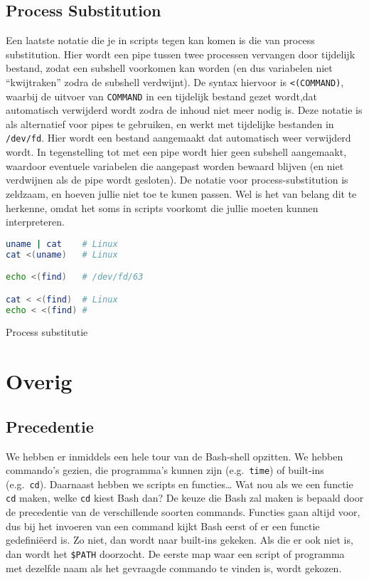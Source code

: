 \subsection{Process Substitution}\label{process-substitution}

Een laatste notatie die je in scripts tegen kan komen is die van process substitution. Hier wordt een pipe tussen twee processen vervangen door tijdelijk bestand, zodat een subshell voorkomen kan worden (en dus variabelen niet ``kwijtraken'' zodra de subshell verdwijnt). De syntax hiervoor is \texttt{\textless{}(COMMAND)}, waarbij de uitvoer van \texttt{COMMAND} in een tijdelijk bestand gezet wordt,dat automatisch verwijderd wordt zodra de inhoud niet meer nodig is. Deze notatie is als alternatief voor pipes te gebruiken, en werkt met tijdelijke bestanden in \texttt{/dev/fd}. Hier wordt een bestand aangemaakt dat automatisch weer verwijderd wordt. In tegenstelling tot met een pipe wordt hier geen subshell aangemaakt, waardoor eventuele variabelen die aangepast worden bewaard blijven (en niet verdwijnen als de pipe wordt gesloten). De notatie voor process-substitution is zeldzaam, en hoeven jullie niet toe te kunen passen. Wel is het van belang dit te herkenne, omdat het soms in scripts voorkomt die jullie moeten kunnen interpreteren.

\begin{listing}
\begin{lstlisting}[language=Bash]
uname | cat    # Linux
cat <(uname)   # Linux

echo <(find)   # /dev/fd/63

cat < <(find)  # Linux
echo < <(find) # 
\end{lstlisting}
\caption{Process substitutie}
\end{listing}

\section{Overig}\label{troubleshooting}

\subsection{Precedentie}\label{precedentie}

We hebben er inmiddels een hele tour van de Bash-shell opzitten. We hebben commando's gezien, die programma's kunnen zijn (e.g.~\texttt{time}) of built-ins (e.g.~\texttt{cd}). Daarnaast hebben we scripts en functies\ldots{} Wat nou als we een functie \texttt{cd} maken, welke \texttt{cd} kiest Bash dan? De keuze die Bash zal maken is bepaald door de precedentie van de verschillende soorten commands. Functies gaan altijd voor, dus bij het invoeren van een command kijkt Bash eerst of er een functie gedefiniëerd is. Zo niet, dan wordt naar built-ins gekeken. Als die er ook niet is, dan wordt het \texttt{\$PATH} doorzocht. De eerste map waar een script of programma met dezelfde naam als het gevraagde commando te vinden is, wordt gekozen.

